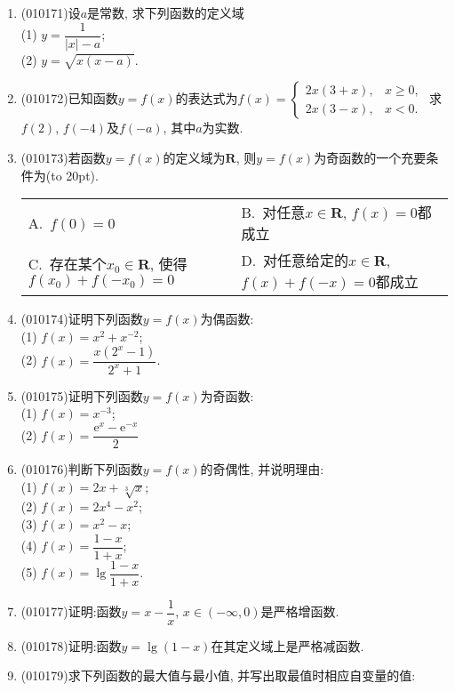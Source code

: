 \documentclass[10pt,a4paper]{article}
\newcommand{\bracket}[1]{(\hbox to #1pt{})}
\newcommand{\twoch}[4]{\par\begin{tabular}{p{.46\textwidth}p{.46\textwidth}}
A.~#1& B.~#2\\
C.~#3& D.~#4
\end{tabular}}
\begin{document}
\begin{enumerate}[1.]
\begin{center}
\end{center}
\item {\tiny (010171)}设$a$是常数, 求下列函数的定义域\\
(1) $y=\dfrac1{|x|-a}$;\\
(2) $y=\sqrt{x(x-a)}$.
\item {\tiny (010172)}已知函数$y=f(x)$的表达式为$f(x)= \begin{cases} 2x(3+x), & x\ge 0,\\ 2x(3-x), & x<0.\end{cases}$ 求$f(2)$, $f(-4)$及$f(-a)$, 其中$a$为实数.
\item {\tiny (010173)}若函数$y=f(x)$的定义域为$\mathbf{R}$, 则$y=f(x)$为奇函数的一个充要条件为\bracket{20}.
\twoch{$f(0)=0$}{对任意$x\in \mathbf{R}$, $f(x)=0$都成立}{存在某个$x_0\in \mathbf{R}$, 使得$f(x_0)+f(-x_0)=0$}{对任意给定的$x\in \mathbf{R}$, $f(x)+f(-x)=0$都成立}
\item {\tiny (010174)}证明下列函数$y=f(x)$为偶函数:\\
(1) $f(x)=x^2+x^{-2}$;\\
(2) $f(x)=\dfrac{x(2^x-1)}{2^x+1}$.
\item {\tiny (010175)}证明下列函数$y=f(x)$为奇函数:\\
(1) $f(x)=x^{-3}$;\\
(2) $f(x)=\dfrac{\mathrm{e}^x-\mathrm{e}^{-x}}2$
\item {\tiny (010176)}判断下列函数$y=f(x)$的奇偶性, 并说明理由:\\
(1) $f(x)=2x+\sqrt[3]x$;\\
(2) $f(x)=2x^4-x^2$;\\
(3) $f(x)=x^2-x$;\\
(4) $f(x)=\dfrac{1-x}{1+x}$;\\
(5) $f(x)=\lg\dfrac {1-x}{1+x}$.
\item {\tiny (010177)}证明:函数$y=x-\dfrac 1x$, $x\in (-\infty, 0)$是严格增函数.
\item {\tiny (010178)}证明:函数$y=\lg (1-x)$在其定义域上是严格减函数.
\item {\tiny (010179)}求下列函数的最大值与最小值, 并写出取最值时相应自变量的值:\\

\end{enumerate}
\end{document}
